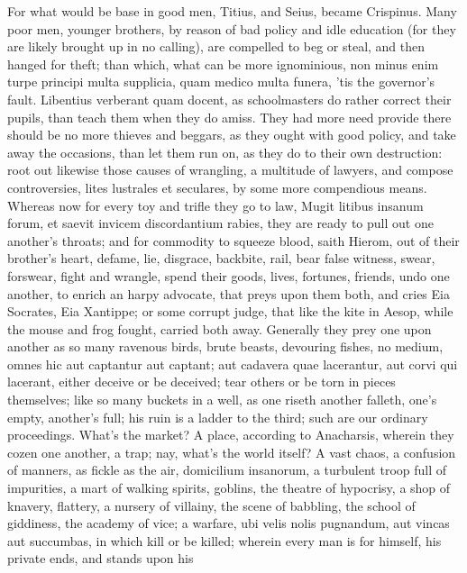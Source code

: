{For what would be base in good men, Titius, and Seius, became
Crispinus.
Many poor men, younger brothers, \etc{} by reason of bad policy and
idle education (for they are likely brought up in no calling), are
compelled to beg or steal, and then hanged for theft; than which, what
can be more ignominious, non minus enim turpe principi multa supplicia,
quam medico multa funera, 'tis the governor's fault. Libentius
verberant quam docent, as schoolmasters do rather correct their pupils,
than teach them when they do amiss. They had more need provide
there should be no more thieves and beggars, as they ought with good
policy, and take away the occasions, than let them run on, as they do
to their own destruction: root out likewise those causes of wrangling,
a multitude of lawyers, and compose controversies, lites lustrales et
seculares, by some more compendious means. Whereas now for every toy
and trifle they go to law, Mugit litibus insanum forum, et saevit
invicem discordantium rabies, they are ready to pull out one another's
throats; and for commodity to squeeze blood, saith Hierom, out of
their brother's heart, defame, lie, disgrace, backbite, rail, bear
false witness, swear, forswear, fight and wrangle, spend their goods,
lives, fortunes, friends, undo one another, to enrich an harpy
advocate, that preys upon them both, and cries Eia Socrates, Eia
Xantippe; or some corrupt judge, that like the kite in Aesop,
while the mouse and frog fought, carried both away. Generally they prey
one upon another as so many ravenous birds, brute beasts, devouring
fishes, no medium, omnes hic aut captantur aut captant; aut
cadavera quae lacerantur, aut corvi qui lacerant, either deceive or be
deceived; tear others or be torn in pieces themselves; like so many
buckets in a well, as one riseth another falleth, one's empty,
another's full; his ruin is a ladder to the third; such are our
ordinary proceedings. What's the market? A place, according to
Anacharsis, wherein they cozen one another, a trap; nay, what's
the world itself? A vast chaos, a confusion of manners, as fickle
as the air, domicilium insanorum, a turbulent troop full of impurities,
a mart of walking spirits, goblins, the theatre of hypocrisy, a shop of
knavery, flattery, a nursery of villainy, the scene of babbling, the
school of giddiness, the academy of vice; a warfare, ubi velis nolis
pugnandum, aut vincas aut succumbas, in which kill or be killed;
wherein every man is for himself, his private ends, and stands upon his
}
